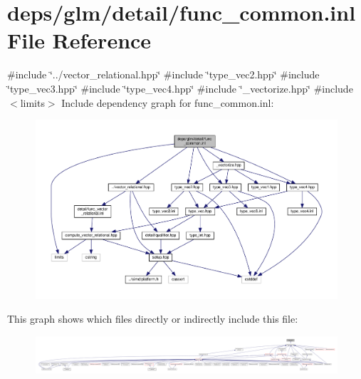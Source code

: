 \hypertarget{func__common_8inl}{}\section{deps/glm/detail/func\+\_\+common.inl File Reference}
\label{func__common_8inl}
{\ttfamily \#include \char`\"{}../vector\+\_\+relational.\+hpp\char`\"{}}\newline
{\ttfamily \#include \char`\"{}type\+\_\+vec2.\+hpp\char`\"{}}\newline
{\ttfamily \#include \char`\"{}type\+\_\+vec3.\+hpp\char`\"{}}\newline
{\ttfamily \#include \char`\"{}type\+\_\+vec4.\+hpp\char`\"{}}\newline
{\ttfamily \#include \char`\"{}\+\_\+vectorize.\+hpp\char`\"{}}\newline
{\ttfamily \#include $<$limits$>$}\newline
Include dependency graph for func\+\_\+common.\+inl\+:
\nopagebreak
\begin{figure}[H]
\begin{center}
\leavevmode
\includegraphics[width=350pt]{dd/dac/func__common_8inl__incl}
\end{center}
\end{figure}
This graph shows which files directly or indirectly include this file\+:
\nopagebreak
\begin{figure}[H]
\begin{center}
\leavevmode
\includegraphics[width=350pt]{d3/d00/func__common_8inl__dep__incl}
\end{center}
\end{figure}
